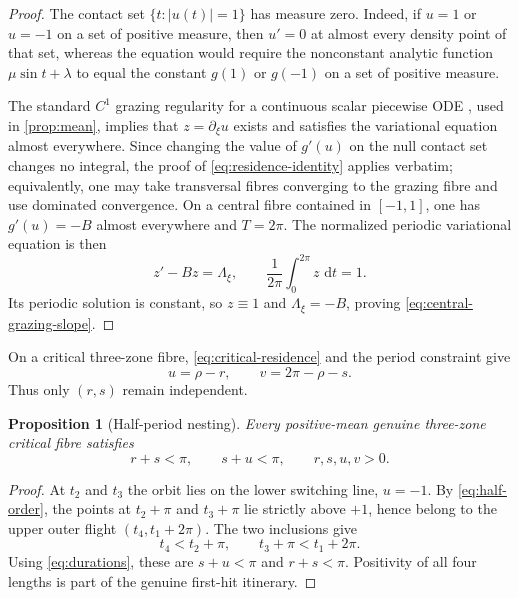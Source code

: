\documentclass[11pt]{article}
\newtheorem{proposition}[theorem]{Proposition}
\newcommand{\dd}{\,\mathrm d}
\begin{document}
\begin{proof}
The contact set \(\{t:|u(t)|=1\}\) has measure zero.  Indeed, if \(u=1\) or
\(u=-1\) on a set of positive measure, then \(u'=0\) at almost every density
point of that set, whereas the equation would require the nonconstant analytic
function \(\mu\sin t+\lambda\) to equal the constant \(g(1)\) or \(g(-1)\) on
a set of positive measure.

The standard \(C^1\) grazing regularity for a continuous scalar piecewise ODE
\cite[Theorem~A.1]{BravoFernandezTineo2007}, used in \cref{prop:mean}, implies
that \(z=\partial_\xi u\) exists and satisfies the variational equation almost
everywhere.  Since changing the value of
\(g'(u)\) on the null contact set changes no integral, the proof of
\eqref{eq:residence-identity} applies verbatim; equivalently, one may take
transversal fibres converging to the grazing fibre and use dominated
convergence.  On a central fibre contained in \([-1,1]\), one has
\(g'(u)=-B\) almost everywhere and \(T=2\pi\).  The normalized periodic
variational equation is then
\[
 z'-Bz=\Lambda_\xi,\qquad \frac1{2\pi}\int_0^{2\pi}z\,\dd t=1.
\]
Its periodic solution is constant, so \(z\equiv1\) and
\(\Lambda_\xi=-B\), proving \eqref{eq:central-grazing-slope}.
\end{proof}

On a critical three-zone fibre, \eqref{eq:critical-residence} and the period constraint give
\begin{equation}\label{eq:eliminate-u-v}
 u=\rho-r,
 \qquad
 v=2\pi-\rho-s.
\end{equation}
Thus only $(r,s)$ remain independent.

\begin{proposition}[Half-period nesting]\label{prop:nesting}
Every positive-mean genuine three-zone critical fibre satisfies
\begin{equation}\label{eq:nesting}
 r+s<\pi,\qquad s+u<\pi,\qquad r,s,u,v>0.
\end{equation}
\end{proposition}

\begin{proof}
At $t_2$ and $t_3$ the orbit lies on the lower switching line, $u=-1$.  By \eqref{eq:half-order}, the points at $t_2+\pi$ and $t_3+\pi$ lie strictly above $+1$, hence belong to the upper outer flight $(t_4,t_1+2\pi)$.  The two inclusions give
\[
 t_4<t_2+\pi,
 \qquad
 t_3+\pi<t_1+2\pi.
\]
Using \eqref{eq:durations}, these are $s+u<\pi$ and $r+s<\pi$.  Positivity of all four lengths is part of the genuine first-hit itinerary.
\end{proof}
\end{document}
